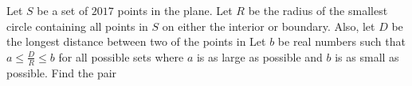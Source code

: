 Let $S$ be a set of $2017$ points in the plane. Let $R$ be the radius of the smallest circle containing all points in $S$ on either the interior or boundary. Also, let $D$ be the longest distance between two of the points in  Let  $b$ be real numbers such that $a\le \frac{D}{R}\le b$ for all possible sets  where $a$ is as large as possible and $b$ is as small as possible. Find the pair 